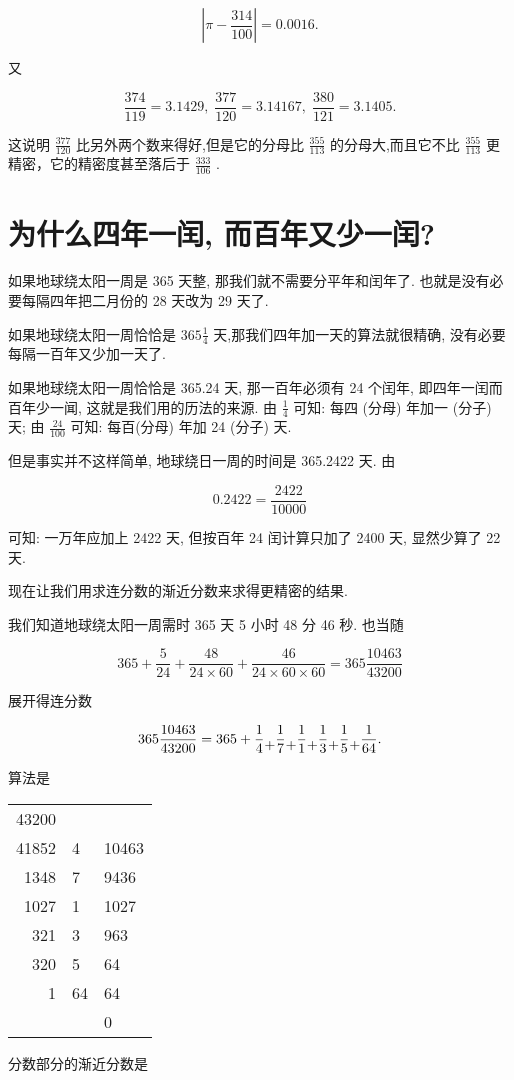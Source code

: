 \documentclass{ctexart}
\newcommand{\cplus}{\raisebox{-1ex}{+}}
\begin{document}
\[
\left| {\pi - \frac{314}{100}}\right| = {0.0016}\text{.}
\]

又

\[
\frac{374}{119} = {3.1429},\;\frac{377}{120} = {3.14167},\;\frac{380}{121} = {3.1405}.
\]

这说明 \(\frac{377}{120}\) 比另外两个数来得好,但是它的分母比 \(\frac{355}{113}\) 的分母大,而且它不比 \(\frac{355}{113}\) 更精密，它的精密度甚至落后于 \(\frac{333}{106}\) .

\section{为什么四年一闰, 而百年又少一闰?}

如果地球绕太阳一周是 365 天整, 那我们就不需要分平年和闰年了. 也就是没有必要每隔四年把二月份的 28 天改为 29 天了.

如果地球绕太阳一周恰恰是 \({365}\frac{1}{4}\) 天,那我们四年加一天的算法就很精确, 没有必要每隔一百年又少加一天了.

如果地球绕太阳一周恰恰是 365.24 天, 那一百年必须有 24 个闰年, 即四年一闰而百年少一闻, 这就是我们用的历法的来源. 由 \(\frac{1}{4}\) 可知: 每四 (分母) 年加一 (分子) 天; 由 \(\frac{24}{100}\) 可知: 每百(分母) 年加 24 (分子) 天.

但是事实并不这样简单, 地球绕日一周的时间是 365.2422 天. 由

\[
{0.2422} = \frac{2422}{10000}
\]

可知: 一万年应加上 2422 天, 但按百年 24 闰计算只加了 2400 天, 显然少算了 22 天.

现在让我们用求连分数的渐近分数来求得更精密的结果.

我们知道地球绕太阳一周需时 365 天 5 小时 48 分 46 秒. 也当随

\[
{365} + \frac{5}{24} + \frac{48}{{24} \times {60}} + \frac{46}{{24} \times {60} \times {60}} = {365}\frac{10463}{43200}
\]

展开得连分数

\[
{365}\frac{10463}{43200} = {365} + \frac{1}{4} \cplus \frac{1}{7} \cplus \frac{1}{1} \cplus \frac{1}{3} \cplus \frac{1}{5} \cplus \frac{1}{64}.
\]

算法是

\begin{table}[h]
  \centering
\begin{tabular}{r|l|l}
43200 &   &      \\
41852 & 4 & 10463 \\ \cline{1-1}
1348  & 7 & 9436 \\ \cline{3-3} 
1027  & 1 & 1027  \\ \cline{1-1}
321   & 3 & 963   \\ \cline{3-3} 
320   & 5 & 64    \\ \cline{1-1}
1    & 64 & 64    \\ \cline{3-3} 
      &  & 0    
\end{tabular}
\end{table}
分数部分的渐近分数是
\end{document}
